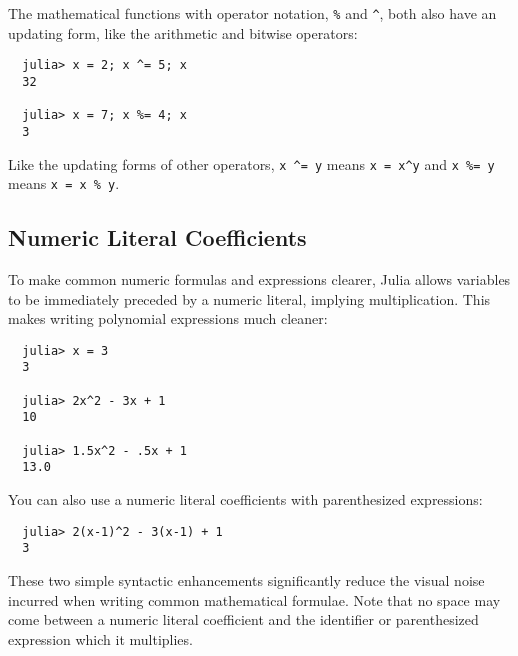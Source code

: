 \documentclass{article}
\begin{document}
The mathematical functions with operator notation, \verb|%| and \verb|^|, both also have an updating form, like the arithmetic and bitwise operators:
\begin{verbatim}
  julia> x = 2; x ^= 5; x
  32

  julia> x = 7; x %= 4; x
  3
\end{verbatim}
Like the updating forms of other operators, \verb|x ^= y| means \verb|x = x^y| and \verb|x %= y| means \verb|x = x % y|.

\subsection{Numeric Literal Coefficients}

To make common numeric formulas and expressions clearer, Julia allows variables to be immediately preceded by a numeric literal, implying multiplication.
This makes writing polynomial expressions much cleaner:
\begin{verbatim}
  julia> x = 3
  3

  julia> 2x^2 - 3x + 1
  10

  julia> 1.5x^2 - .5x + 1
  13.0
\end{verbatim}
You can also use a numeric literal coefficients with parenthesized expressions:
\begin{verbatim}
  julia> 2(x-1)^2 - 3(x-1) + 1
  3
\end{verbatim}
These two simple syntactic enhancements significantly reduce the visual noise incurred when writing common mathematical formulae.
Note that no space may come between a numeric literal coefficient and the identifier or parenthesized expression which it multiplies.
\end{document}
